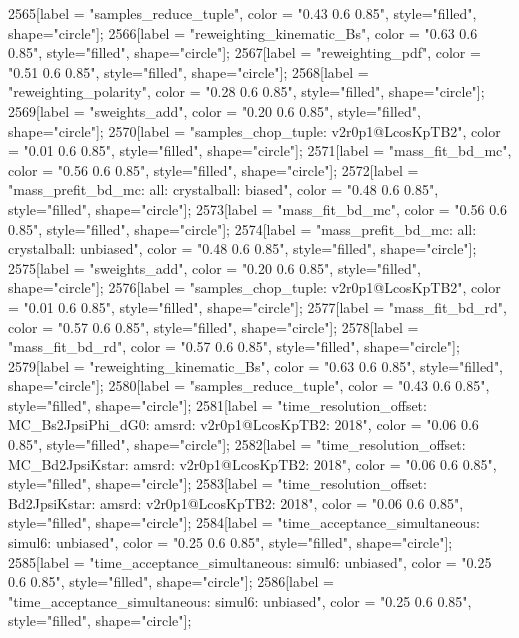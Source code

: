 {	2565[label = "samples_reduce_tuple", color = "0.43 0.6 0.85", style="filled", shape="circle"];
	2566[label = "reweighting_kinematic_Bs", color = "0.63 0.6 0.85", style="filled", shape="circle"];
	2567[label = "reweighting_pdf", color = "0.51 0.6 0.85", style="filled", shape="circle"];
	2568[label = "reweighting_polarity", color = "0.28 0.6 0.85", style="filled", shape="circle"];
	2569[label = "sweights_add", color = "0.20 0.6 0.85", style="filled", shape="circle"];
	2570[label = "samples_chop_tuple\nversion: v2r0p1@LcosKpTB2", color = "0.01 0.6 0.85", style="filled", shape="circle"];
	2571[label = "mass_fit_bd_mc", color = "0.56 0.6 0.85", style="filled", shape="circle"];
	2572[label = "mass_prefit_bd_mc\nmassbin: all\nmassmodel: crystalball\ntrigger: biased", color = "0.48 0.6 0.85", style="filled", shape="circle"];
	2573[label = "mass_fit_bd_mc", color = "0.56 0.6 0.85", style="filled", shape="circle"];
	2574[label = "mass_prefit_bd_mc\nmassbin: all\nmassmodel: crystalball\ntrigger: unbiased", color = "0.48 0.6 0.85", style="filled", shape="circle"];
	2575[label = "sweights_add", color = "0.20 0.6 0.85", style="filled", shape="circle"];
	2576[label = "samples_chop_tuple\nversion: v2r0p1@LcosKpTB2", color = "0.01 0.6 0.85", style="filled", shape="circle"];
	2577[label = "mass_fit_bd_rd", color = "0.57 0.6 0.85", style="filled", shape="circle"];
	2578[label = "mass_fit_bd_rd", color = "0.57 0.6 0.85", style="filled", shape="circle"];
	2579[label = "reweighting_kinematic_Bs", color = "0.63 0.6 0.85", style="filled", shape="circle"];
	2580[label = "samples_reduce_tuple", color = "0.43 0.6 0.85", style="filled", shape="circle"];
	2581[label = "time_resolution_offset\nmode: MC_Bs2JpsiPhi_dG0\ntimeres: amsrd\nversion: v2r0p1@LcosKpTB2\nyear: 2018", color = "0.06 0.6 0.85", style="filled", shape="circle"];
	2582[label = "time_resolution_offset\nmode: MC_Bd2JpsiKstar\ntimeres: amsrd\nversion: v2r0p1@LcosKpTB2\nyear: 2018", color = "0.06 0.6 0.85", style="filled", shape="circle"];
	2583[label = "time_resolution_offset\nmode: Bd2JpsiKstar\ntimeres: amsrd\nversion: v2r0p1@LcosKpTB2\nyear: 2018", color = "0.06 0.6 0.85", style="filled", shape="circle"];
	2584[label = "time_acceptance_simultaneous\ntimeacc: simul6\ntrigger: unbiased", color = "0.25 0.6 0.85", style="filled", shape="circle"];
	2585[label = "time_acceptance_simultaneous\ntimeacc: simul6\ntrigger: unbiased", color = "0.25 0.6 0.85", style="filled", shape="circle"];
	2586[label = "time_acceptance_simultaneous\ntimeacc: simul6\ntrigger: unbiased", color = "0.25 0.6 0.85", style="filled", shape="circle"];
}
